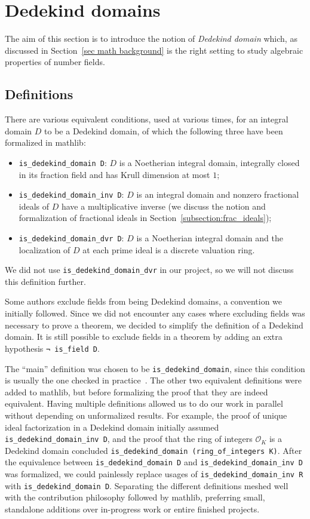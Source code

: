\documentclass[a4paper,USenglish,cleveref, autoref, thm-restate]{lipics-v2021}
\newcommand{\lean}[1]{\texttt{#1}\xspace} %
\newcommand*{\OK}[1][K]{\mathcal{O}_{#1}}
\newcommand{\mathlib}{\textsf{mathlib}\xspace}
\begin{document}
\section{Dedekind domains} \label{sec:Dedekind-domain}
The aim of this section is to introduce the notion of \emph{Dedekind domain} which, as discussed in Section~\ref{sec math background} is the right setting to study algebraic properties of number fields.
\subsection{Definitions}\label{subsec:definitions_DD}
There are various equivalent conditions, used at various times, for an integral domain $D$ to be a Dedekind domain,
of which the following three have been formalized in \mathlib:
\begin{itemize}
\item \lean{is\_dedekind\_domain D}: $D$ is a Noetherian integral domain, integrally closed in its fraction field and has Krull dimension at most $1$;
\item \lean{is\_dedekind\_domain\_inv D}: $D$ is an integral domain and nonzero fractional ideals of $D$ have a multiplicative inverse (we discuss the notion and formalization of fractional ideals in Section~\ref{subsection:frac_ideals});
\item \lean{is\_dedekind\_domain\_dvr D}: $D$ is a Noetherian integral domain and the localization of $D$ at each prime ideal is a discrete valuation ring.
\end{itemize}
We did not use \lean{is\_dedekind\_domain\_dvr} in our project, so we will not discuss this definition further.

Some authors exclude fields from being Dedekind domains, a convention we initially followed.
Since we did not encounter any cases where excluding fields was necessary to prove a theorem,
we decided to simplify the definition of a Dedekind domain.
It is still possible to exclude fields in a theorem by adding an extra hypothesis \lean{¬ is\_field D}.

The ``main'' definition was chosen to be \lean{is\_dedekind\_domain},
since this condition is usually the one checked in practice~\cite{Neukirch}.
The other two equivalent definitions were added to \mathlib, but before formalizing the proof that they are indeed equivalent.
Having multiple definitions allowed us to do our work in parallel without depending on unformalized results.
For example,
the proof of unique ideal factorization in a Dedekind domain initially assumed \lean{is\_dedekind\_domain\_inv D},
and the proof that the ring of integers $\OK$ is a Dedekind domain concluded \lean{is\_dedekind\_domain (ring\_of\_integers K)}.
After the equivalence between \lean{is\_dedekind\_domain D} and \lean{is\_dedekind\_domain\_inv D} was formalized,
we could painlessly replace usages of \lean{is\_dedekind\_domain\_inv R} with \lean{is\_dedekind\_domain D}.
Separating the different definitions meshed well with the contribution philosophy followed by \mathlib, preferring small, standalone additions over in-progress work or entire finished projects.
\end{document}
